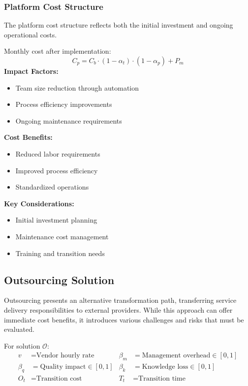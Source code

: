 \documentclass[12pt,a4paper]{article}
\newenvironment{definition}[1]
{\begin{mdframed}[style=definitionstyle,frametitle={Definition: #1}]}
{\end{mdframed}}
\newenvironment{observation}
{\begin{mdframed}[style=observationstyle,frametitle={Observation}]}
{\end{mdframed}}
\begin{document}
\subsubsection{Platform Cost Structure}
The platform cost structure reflects both the initial investment and ongoing operational costs.

\begin{definition}{Platform Cost}
Monthly cost after implementation:
\begin{equation}
    C_p = C_b \cdot (1 - \alpha_t) \cdot (1 - \alpha_p) + P_m
\end{equation}
\textbf{Impact Factors:}
\begin{itemize}
    \item Team size reduction through automation
    \item Process efficiency improvements
    \item Ongoing maintenance requirements
\end{itemize}
\end{definition}

\begin{observation}
\textbf{Cost Benefits:}
\begin{itemize}
    \item Reduced labor requirements
    \item Improved process efficiency
    \item Standardized operations
\end{itemize}
\textbf{Key Considerations:}
\begin{itemize}
    \item Initial investment planning
    \item Maintenance cost management
    \item Training and transition needs
\end{itemize}
\end{observation}

\subsection{Outsourcing Solution}
Outsourcing presents an alternative transformation path, transferring service delivery responsibilities to external providers. While this approach can offer immediate cost benefits, it introduces various challenges and risks that must be evaluated.

\begin{definition}{Outsourcing Variables}
For solution $\mathcal{O}$:
\begin{align*}
    v &= \text{Vendor hourly rate} & \beta_m &= \text{Management overhead} \in [0,1] \\
    \beta_q &= \text{Quality impact} \in [0,1] & \beta_k &= \text{Knowledge loss} \in [0,1] \\
    O_t &= \text{Transition cost} & T_t &= \text{Transition time}
\end{align*}
\end{definition}
\end{document}
